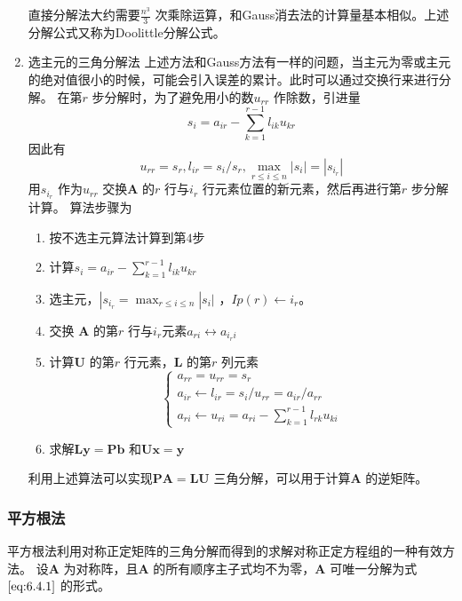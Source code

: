 \documentclass[a4paper]{article}
\begin{document}
\begin{enumerate}
\begin{enumerate}
\[				\] 
		\end{enumerate}
		直接分解法大约需要$\frac{n^3}{3}$ 次乘除运算，和Gauss消去法的计算量基本相似。上述分解公式又称为Doolittle分解公式。
	\item 选主元的三角分解法
		上述方法和Gauss方法有一样的问题，当主元为零或主元的绝对值很小的时候，可能会引入误差的累计。此时可以通过交换行来进行分解。
		在第$r$ 步分解时，为了避免用小的数$u_{rr}$ 作除数，引进量
		\[
			s_i = a_{ir} - \sum_{k=1}^{r-1} l_{ik} u_{kr}
		\] 
		因此有
		\[
			u_{rr} = s_r, l_{ir} = s_i / s_r, \max_{r \le i \le n} |s_i| = |s_{i_r}|
		\] 
		用$s_{i_r}$ 作为$u_{rr}$ 交换$\mathbf{A}$ 的$r$ 行与$i_r$ 行元素位置的新元素，然后再进行第$r$ 步分解计算。
		算法步骤为
		\begin{enumerate}
			\item 按不选主元算法计算到第$4$步
			\item 计算$s_i = a_{ir} - \sum_{k=1}^{r-1} l_{ik} u_{kr}$
			\item 选主元，$|s_{i_r} = \max_{r \le i \le n} |s_i|$ ，$Ip(r) \gets i_r$。
			\item 交换 $\mathbf{A}$ 的第$r$ 行与$i_r$元素$a_{ri} \leftrightarrow a_{i_r i}$
			\item 计算$\mathbf{U}$ 的第$r$ 行元素，$\mathbf{L}$ 的第$r$ 列元素
				\[
					\begin{cases}
						a_{rr} = u_{rr} = s_r \\
						a_{ir} \gets l_{ir} = s_i / u_{rr} = a_{ir} / a_{rr} \\
						a_{ri} \gets u_{ri} = a_{ri} - \sum_{k=1}^{r-1} l_{rk} u_{ki}
					\end{cases}
				\] 
			\item 求解$\mathbf{Ly} = \mathbf{Pb}$ 和$\mathbf{Ux} = \mathbf{y}$
		\end{enumerate}
		利用上述算法可以实现$\mathbf{PA} = \mathbf{LU}$ 三角分解，可以用于计算$\mathbf{A}$ 的逆矩阵。


\end{enumerate}

\subsubsection{平方根法}
平方根法利用对称正定矩阵的三角分解而得到的求解对称正定方程组的一种有效方法。
设$\mathbf{A}$ 为对称阵，且$\mathbf{A}$ 的所有顺序主子式均不为零，$\mathbf{A}$ 可唯一分解为式$\ref{eq:6.4.1}$ 的形式。
\end{document}
